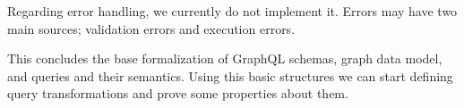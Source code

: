 Regarding error handling, we currently do not implement it. Errors may have two main sources; validation errors and execution errors.




This concludes the base formalization of GraphQL schemas, graph data model, and queries and their semantics. Using this basic structures we can start defining query transformations and prove some properties about them.
